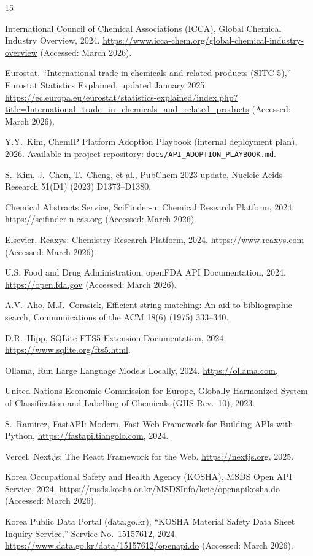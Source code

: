 \documentclass[preprint,12pt]{elsarticle}
\begin{document}
\begin{thebibliography}{15}

International Council of Chemical Associations (ICCA), Global Chemical Industry Overview, 2024. \url{https://www.icca-chem.org/global-chemical-industry-overview} (Accessed: March 2026).

Eurostat, ``International trade in chemicals and related products (SITC 5),'' Eurostat Statistics Explained, updated January 2025. \url{https://ec.europa.eu/eurostat/statistics-explained/index.php?title=International_trade_in_chemicals_and_related_products} (Accessed: March 2026).

Y.Y.~Kim, ChemIP Platform Adoption Playbook (internal deployment plan), 2026. Available in project repository: \texttt{docs/API\_ADOPTION\_PLAYBOOK.md}.

S.~Kim, J.~Chen, T.~Cheng, et al., PubChem 2023 update, Nucleic Acids Research 51(D1) (2023) D1373--D1380.

Chemical Abstracts Service, SciFinder-n: Chemical Research Platform, 2024. \url{https://scifinder-n.cas.org} (Accessed: March 2026).

Elsevier, Reaxys: Chemistry Research Platform, 2024. \url{https://www.reaxys.com} (Accessed: March 2026).

U.S. Food and Drug Administration, openFDA API Documentation, 2024. \url{https://open.fda.gov} (Accessed: March 2026).

A.V.~Aho, M.J.~Corasick, Efficient string matching: An aid to bibliographic search, Communications of the ACM 18(6) (1975) 333--340.

D.R.~Hipp, SQLite FTS5 Extension Documentation, 2024. \url{https://www.sqlite.org/fts5.html}.

Ollama, Run Large Language Models Locally, 2024. \url{https://ollama.com}.

United Nations Economic Commission for Europe, Globally Harmonized System of Classification and Labelling of Chemicals (GHS Rev.~10), 2023.

S.~Ramirez, FastAPI: Modern, Fast Web Framework for Building APIs with Python, \url{https://fastapi.tiangolo.com}, 2024.

Vercel, Next.js: The React Framework for the Web, \url{https://nextjs.org}, 2025.

Korea Occupational Safety and Health Agency (KOSHA), MSDS Open API Service, 2024. \url{https://msds.kosha.or.kr/MSDSInfo/kcic/openapikosha.do} (Accessed: March 2026).

Korea Public Data Portal (data.go.kr), ``KOSHA Material Safety Data Sheet Inquiry Service,'' Service No.~15157612, 2024. \url{https://www.data.go.kr/data/15157612/openapi.do} (Accessed: March 2026).

\end{thebibliography}
\end{document}
